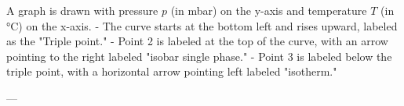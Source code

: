 A graph is drawn with pressure \( p \) (in mbar) on the y-axis and temperature \( T \) (in °C) on the x-axis.  
- The curve starts at the bottom left and rises upward, labeled as the "Triple point."  
- Point 2 is labeled at the top of the curve, with an arrow pointing to the right labeled "isobar single phase."  
- Point 3 is labeled below the triple point, with a horizontal arrow pointing left labeled "isotherm."  

---